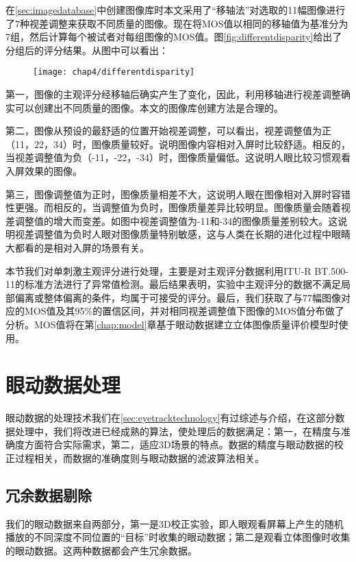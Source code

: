 在\ref{sec:imagedatabase}中创建图像库时本文采用了“移轴法”对选取的11幅图像进行了7种视差调整来获取不同质量的图像。现在将MOS值以相同的移轴值为基准分为7组，然后计算每个被试者对每组图像的MOS值。图\ref{fig:differentdisparity}给出了分组后的评分结果。从图中可以看出：
\begin{figure}[!ht]
  \centering
  \texttt{[image: chap4/differentdisparity]}
\end{figure}

第一，图像的主观评分经移轴后确实产生了变化，因此，利用移轴进行视差调整确实可以创建出不同质量的图像。本文的图像库创建方法是合理的。

第二，图像从预设的最舒适的位置开始视差调整，可以看出，视差调整值为正（11，22，34）时，图像质量较好。说明图像内容相对入屏时比较舒适。相反的，当视差调整值为负（-11，-22，-34）时，图像质量偏低。这说明人眼比较习惯观看入屏效果的图像。

第三，图像调整值为正时，图像质量相差不大，这说明人眼在图像相对入屏时容错性更强。而相反的，当调整值为负时，图像质量差异比较明显。图像质量会随着视差调整值的增大而变差。如图中视差调整值为-11和-34的图像质量差别较大。这说明视差调整值为负时人眼对图像质量特别敏感，这与人类在长期的进化过程中眼睛大都看的是相对入屏的场景有关。

本节我们对单刺激主观评分进行处理，主要是对主观评分数据利用ITU-R BT.500-11的标准方法进行了异常值检测。最后结果表明，实验中主观评分的数据不满足局部偏离或整体偏离的条件，均属于可接受的评分。最后，我们获取了与77幅图像对应的MOS值及其95\%的置信区间，并对相同视差调整值下图像的MOS值分布做了分析。MOS值将在第\ref{chap:model}章基于眼动数据建立立体图像质量评价模型时使用。
\section{眼动数据处理}
\label{sec:eyetrackdataprocess}
眼动数据的处理技术我们在\ref{sec:eyetracktechnology}有过综述与介绍，在这部分数据处理中，我们将改进已经成熟的算法，使处理后的数据满足：第一，在精度与准确度方面符合实际需求，第二，适应3D场景的特点。数据的精度与眼动数据的校正过程相关，而数据的准确度则与眼动数据的滤波算法相关。

\subsection{冗余数据剔除}
\label{sec:dropoverdata}
我们的眼动数据来自两部分，第一是3D校正实验，即人眼观看屏幕上产生的随机播放的不同深度不同位置的“目标”时收集的眼动数据；第二是观看立体图像时收集的眼动数据。这两种数据都会产生冗余数据。

